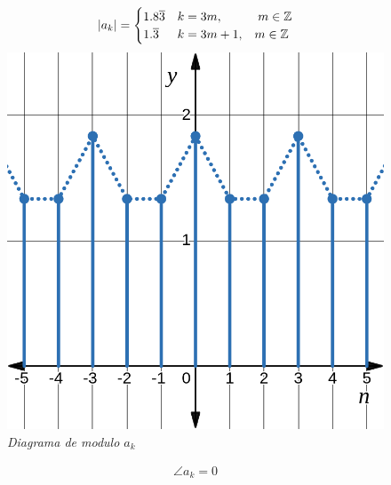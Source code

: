 \documentclass[a4paper,12pt]{report}
\begin{document}
\begin{enumerate}[label=\alph*), left=0pt]
    \begin{figure}[H]
      \centering
      \noindent
      \begin{minipage}{0.4\textwidth}
        \centering
        \begin{align*}
          |a_k| =
          \begin{cases}
            1.8\overline{3} &k = 3m, \hspace{1cm} m \in \mathbb{Z}\\
            1.\overline{3} &k = 3m+1, \hspace{3mm} m \in \mathbb{Z}
          \end{cases}
        \end{align*}
        \includegraphics[width=1\textwidth]{./images/ej5.1.png}
        \textit{Diagrama de modulo $a_k$}
      \end{minipage}
      \hspace{1cm}
      \begin{minipage}{0.4\textwidth}
        \centering
        \begin{align*}
          \angle a_k = 0\\
        \end{align*}

\end{minipage}
\end{figure}
\end{enumerate}
\end{document}
